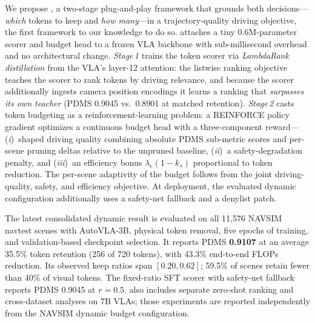 \documentclass[letterpaper]{article} %
\begin{document}
We propose \ours{}, a two-stage plug-and-play framework that grounds both
decisions---\emph{which} tokens to keep and \emph{how many}---in a
trajectory-quality driving objective, the first framework to our knowledge to do so.
\ours{} attaches a tiny 0.6M-parameter scorer and budget head to a frozen VLA
backbone with sub-millisecond overhead and no architectural change.
\emph{Stage\,1} trains the token scorer via \emph{LambdaRank distillation}
from the VLA's layer-12 attention: the listwise ranking objective teaches the
scorer to rank tokens by driving relevance, and because the scorer additionally
ingests camera position encodings it learns a ranking that \emph{surpasses its
own teacher} (PDMS 0.9045 vs.\ 0.8901 at matched retention).
\emph{Stage\,2} casts token budgeting as a reinforcement-learning problem: a
REINFORCE policy gradient optimizes a continuous budget head with a
three-component reward---(\textit{i})~shaped driving quality combining absolute
PDMS sub-metric scores and per-scene pruning deltas relative to the unpruned
baseline, (\textit{ii})~a safety-degradation penalty, and
(\textit{iii})~an efficiency bonus $\lambda_{e}(1{-}k_s)$ proportional
to token reduction.
The per-scene adaptivity of the budget follows from the joint driving-quality,
safety, and efficiency objective. At deployment, the evaluated dynamic
configuration additionally uses a safety-net fallback and a denylist patch.

The latest consolidated dynamic result is evaluated on all 11,576 NAVSIM navtest
scenes with AutoVLA-3B, physical token removal, five epochs of training, and
validation-based checkpoint selection. It reports PDMS
\textbf{0.9107} at an average 35.5\% token retention (256 of 720 tokens), with
43.3\% end-to-end FLOPs reduction. Its observed keep ratios span $[0.20,0.62]$;
59.5\% of scenes retain fewer than 40\% of visual tokens. The fixed-ratio SFT
scorer with safety-net fallback reports PDMS 0.9045 at $r{=}0.5$. \ours{} also
includes separate zero-shot ranking and cross-dataset analyses on 7B VLAs;
those experiments are reported independently from the NAVSIM dynamic budget
configuration.
\end{document}
